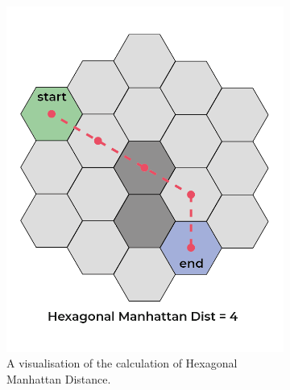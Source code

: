 \documentclass{article}
\begin{document}
\begin{figure}[]
    \centering
    \begin{subfigure}[b]{0.4\linewidth}
      \includegraphics[width=\linewidth]{hex-both-manhattan.png}
      \caption{A visualisation of the calculation of Hexagonal Manhattan Distance.}
      \label{fig: hex manhattan}
    \end{subfigure}
    \hspace{1cm}
    \begin{subfigure}[b]{0.4\linewidth}

\end{subfigure}
\end{figure}
\end{document}
